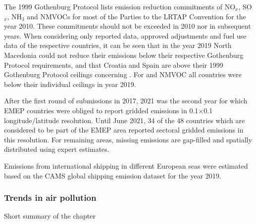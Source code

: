 The 1999 Gothenburg Protocol lists emission reduction commitments of NO$_x$, SO$_x$, NH$_3$ and NMVOCs for most of the Parties to the LRTAP Convention for the year 2010. These commitments should not be exceeded in 2010 nor in subsequent years. When considering only reported data, approved adjustments and fuel use data of the respective countries, it can be seen that in the year 2019 North Macedonia could not reduce their \sox emissions below their respective Gothenburg Protocol requirements, and that Croatia and Spain are above their 1999 Gothenburg Protocol ceilings concerning \nhiii. For \nox and NMVOC all countries were below their individual ceilings in year 2019.

After the first round of submissions in 2017, 2021 was the second year for which EMEP countries were obliged to report gridded emissions in  0.1{\degrees}$\times$0.1{\degrees} lon\-gi\-tude/la\-ti\-tude resolution. Until June 2021, 34 of the 48 countries which are considered to be part of the EMEP area reported sectoral gridded emissions in this resolution. For remaining areas, missing emissions are gap-filled and spatially distributed using expert estimates.

Emissions from international shipping in different European seas were estimated based on the CAMS global shipping emission dataset for the year 2019.

\subsubsection*{Trends in air pollution}
Short summary of the chapter


